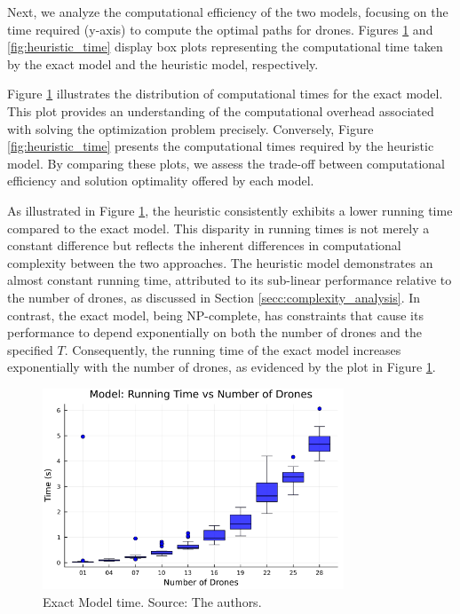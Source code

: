 Next, we analyze the computational efficiency of the two models, focusing on the time required (y-axis) to compute the optimal paths for drones. Figures \ref{fig:exact_model_time} and \ref{fig:heuristic_time} display box plots representing the computational time taken by the exact model and the heuristic model, respectively. 

Figure \ref{fig:exact_model_time} illustrates the distribution of computational times for the exact model. This plot provides an understanding of the computational overhead associated with solving the optimization problem precisely. Conversely, Figure \ref{fig:heuristic_time} presents the computational times required by the heuristic model. By comparing these plots, we assess the trade-off between computational efficiency and solution optimality offered by each model.

As illustrated in Figure \ref{fig:exact_model_time}, the heuristic consistently exhibits a lower running time compared to the exact model. This disparity in running times is not merely a constant difference but reflects the inherent differences in computational complexity between the two approaches. The heuristic model demonstrates an almost constant running time, attributed to its sub-linear performance relative to the number of drones, as discussed in Section \ref{secc:complexity_analysis}. In contrast, the exact model, being NP-complete, has constraints that cause its performance to depend exponentially on both the number of drones and the specified $T$. Consequently, the running time of the exact model increases exponentially with the number of drones, as evidenced by the plot in Figure \ref{fig:exact_model_time}.


\begin{figure}[H]
    \centering
    \includegraphics[width=0.8\textwidth]{img/julia_time_boxplot_vs_drones.png}
    \caption{Exact Model time. Source: The authors.}
    \label{fig:exact_model_time}
\end{figure}

